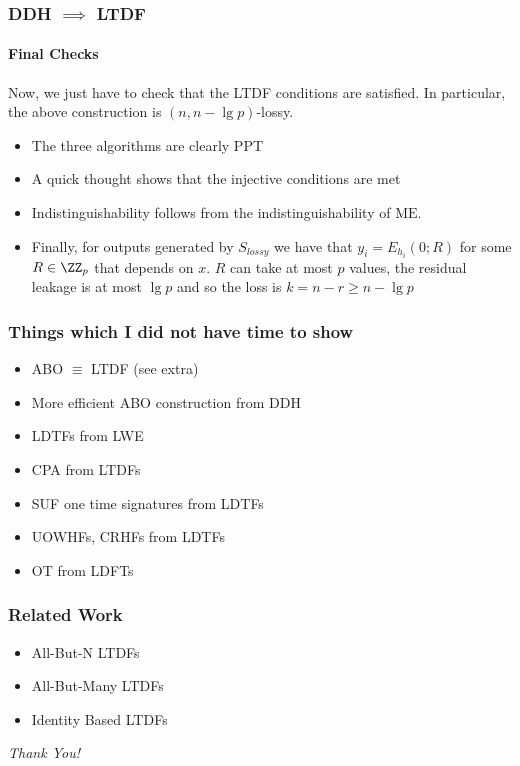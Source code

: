 \documentclass{beamer}
\begin{document}
\begin{frame}
    \frametitle{DDH $\implies$ LTDF}
    \framesubtitle{Final Checks}
    Now, we just have to check that the LTDF conditions are satisfied.
    In particular, the above construction is $(n, n - \lg p)$-lossy.
    \begin{itemize}
        \item The three algorithms are clearly PPT
        \item A quick thought shows that the injective conditions are met
        \item Indistinguishability follows from the indistinguishability of $\mathrm{ME}$.
        \item Finally, for outputs generated by $S_{lossy}$ we have that
              $y_i = E_{h_i}(0; R)$ for some $R \in \ZZ_p$ that depends on $x$. $R$ can take
              at most $p$ values, the residual leakage is at most $\lg p$ and so the loss is
              $k = n - r \geq n - \lg p$
    \end{itemize}
\end{frame}

\begin{frame}
    \frametitle{Things which I did not have time to show}
    \begin{itemize}
        \item ABO $\equiv$ LTDF (see extra)
        \item More efficient ABO construction from DDH
        \item LDTFs from LWE
        \item CPA from LTDFs
        \item SUF one time signatures from LDTFs
        \item UOWHFs, CRHFs from LDTFs
        \item OT from LDFTs
    \end{itemize}
\end{frame}

\begin{frame}
    \frametitle{Related Work}
    \begin{itemize}
        \item All-But-N LTDFs
        \item All-But-Many LTDFs
        \item Identity Based LTDFs
    \end{itemize}
\end{frame}

\begin{frame}{}
    \centering \Large
    \emph{Thank You!}
\end{frame}
\end{document}
